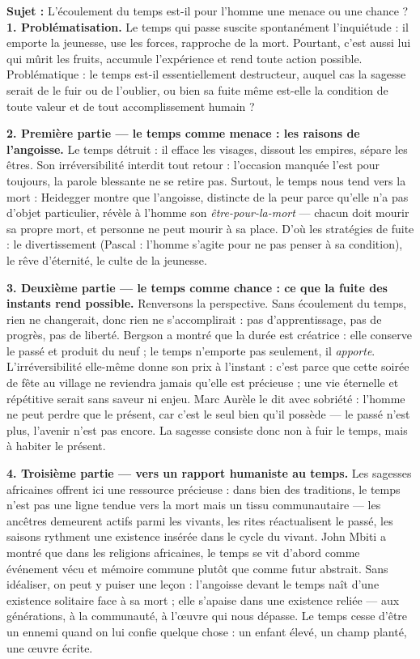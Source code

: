 \documentclass[11pt]{article}
\begin{document}
\begin{exoresolu}
\textbf{Sujet :} L'écoulement du temps est-il pour l'homme une menace ou une chance ?
\tcblower
\textbf{1. Problématisation.} Le temps qui passe suscite spontanément l'inquiétude : il emporte la jeunesse, use les forces, rapproche de la mort. Pourtant, c'est aussi lui qui mûrit les fruits, accumule l'expérience et rend toute action possible. Problématique : le temps est-il essentiellement destructeur, auquel cas la sagesse serait de le fuir ou de l'oublier, ou bien sa fuite même est-elle la condition de toute valeur et de tout accomplissement humain ?

\textbf{2. Première partie --- le temps comme menace : les raisons de l'angoisse.} Le temps détruit : il efface les visages, dissout les empires, sépare les êtres. Son irréversibilité interdit tout retour : l'occasion manquée l'est pour toujours, la parole blessante ne se retire pas. Surtout, le temps nous tend vers la mort : Heidegger montre que l'angoisse, distincte de la peur parce qu'elle n'a pas d'objet particulier, révèle à l'homme son \emph{être-pour-la-mort} --- chacun doit mourir sa propre mort, et personne ne peut mourir à sa place. D'où les stratégies de fuite : le divertissement (Pascal : l'homme s'agite pour ne pas penser à sa condition), le rêve d'éternité, le culte de la jeunesse.

\textbf{3. Deuxième partie --- le temps comme chance : ce que la fuite des instants rend possible.} Renversons la perspective. Sans écoulement du temps, rien ne changerait, donc rien ne s'accomplirait : pas d'apprentissage, pas de progrès, pas de liberté. Bergson a montré que la durée est créatrice : elle conserve le passé et produit du neuf ; le temps n'emporte pas seulement, il \emph{apporte}. L'irréversibilité elle-même donne son prix à l'instant : c'est parce que cette soirée de fête au village ne reviendra jamais qu'elle est précieuse ; une vie éternelle et répétitive serait sans saveur ni enjeu. Marc Aurèle le dit avec sobriété : l'homme ne peut perdre que le présent, car c'est le seul bien qu'il possède --- le passé n'est plus, l'avenir n'est pas encore. La sagesse consiste donc non à fuir le temps, mais à habiter le présent.

\textbf{4. Troisième partie --- vers un rapport humaniste au temps.} Les sagesses africaines offrent ici une ressource précieuse : dans bien des traditions, le temps n'est pas une ligne tendue vers la mort mais un tissu communautaire --- les ancêtres demeurent actifs parmi les vivants, les rites réactualisent le passé, les saisons rythment une existence insérée dans le cycle du vivant. John Mbiti a montré que dans les religions africaines, le temps se vit d'abord comme événement vécu et mémoire commune plutôt que comme futur abstrait. Sans idéaliser, on peut y puiser une leçon : l'angoisse devant le temps naît d'une existence solitaire face à sa mort ; elle s'apaise dans une existence reliée --- aux générations, à la communauté, à l'œuvre qui nous dépasse. Le temps cesse d'être un ennemi quand on lui confie quelque chose : un enfant élevé, un champ planté, une œuvre écrite.


\end{exoresolu}
\end{document}
